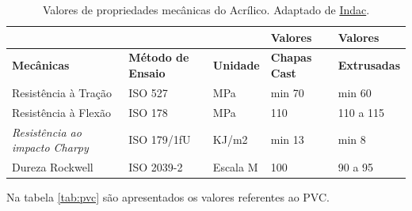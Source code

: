 			\begin{table}[H]
			\centering
			\caption[Valores de propriedades mecânicas do Acrílico]{Valores de propriedades mecânicas do Acrílico. Adaptado de \href{http://www.indac.org.br/arquivos/acrilico\_indac.pdf}{Indac}.}
			\label{acrilico}
			\begin{tabular}{lll|l|l|}
			\cline{4-5}
			\textbf{}                                                    & \textbf{}                                      & \textbf{}        & \textbf{Valores}     & \textbf{Valores}    \\ \hline
			\multicolumn{1}{|l|}{\textbf{Mecânicas}}                     & \multicolumn{1}{l|}{\textbf{Método de Ensaio}} & \textbf{Unidade} & \textbf{Chapas Cast} & \textbf{Extrusadas} \\ \hline
			\multicolumn{1}{|l|}{Resistência à Tração}                   & \multicolumn{1}{l|}{ISO 527}                   & MPa              & min 70               & min 60              \\ \hline
			\multicolumn{1}{|l|}{Resistência à Flexão}                   & \multicolumn{1}{l|}{ISO 178}                   & MPa              & 110                  & 110 a 115           \\ \hline
			\multicolumn{1}{|l|}{\textit{Resistência ao impacto Charpy}} & \multicolumn{1}{l|}{ISO 179/1fU}               & KJ/m2            & min 13               & min 8               \\ \hline
			\multicolumn{1}{|l|}{Dureza Rockwell}                        & \multicolumn{1}{l|}{ISO 2039-2}                & Escala M         & 100                  & 90 a 95             \\ \hline
			\end{tabular}
			\end{table}

			Na tabela \ref{tab:pvc} são apresentados os valores referentes ao PVC.

